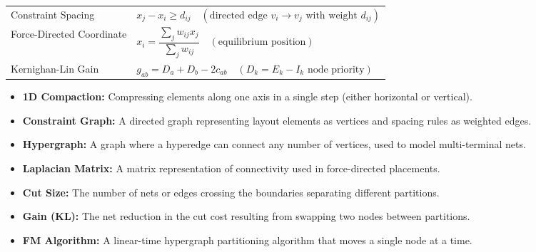 \documentclass[12pt,a4paper]{article}
\renewcommand{\arraystretch}{1.45}
\begin{document}
\begin{tcolorbox}[formulabox, title={\textbf{Key Formulas and Metrics at a Glance}}]
\renewcommand{\arraystretch}{1.35}
\begin{tabularx}{\linewidth}{B{5.0cm} X}
  Constraint Spacing & $x_j - x_i \ge d_{ij} \quad (\text{directed edge } v_i \rightarrow v_j \text{ with weight } d_{ij})$ \\[4pt]
  Force-Directed Coordinate & $x_i = \dfrac{\sum_{j} w_{ij} x_j}{\sum_{j} w_{ij}} \quad (\text{equilibrium position})$ \\[4pt]
  Kernighan-Lin Gain & $g_{ab} = D_a + D_b - 2c_{ab} \quad (D_k = E_k - I_k \text{ node priority})$
\end{tabularx}
\end{tcolorbox}

\vspace{6pt}

\begin{tcolorbox}[defbox, title={\textbf{One-Line Definitions}}]
\begin{itemize}[leftmargin=*, itemsep=3pt, topsep=0pt]
  \item \textbf{1D Compaction:} Compressing elements along one axis in a single step (either horizontal or vertical).
  \item \textbf{Constraint Graph:} A directed graph representing layout elements as vertices and spacing rules as weighted edges.
  \item \textbf{Hypergraph:} A graph where a hyperedge can connect any number of vertices, used to model multi-terminal nets.
  \item \textbf{Laplacian Matrix:} A matrix representation of connectivity used in force-directed placements.
  \item \textbf{Cut Size:} The number of nets or edges crossing the boundaries separating different partitions.
  \item \textbf{Gain (KL):} The net reduction in the cut cost resulting from swapping two nodes between partitions.
  \item \textbf{FM Algorithm:} A linear-time hypergraph partitioning algorithm that moves a single node at a time.
\end{itemize}
\end{tcolorbox}

\vspace{6pt}
\end{document}
